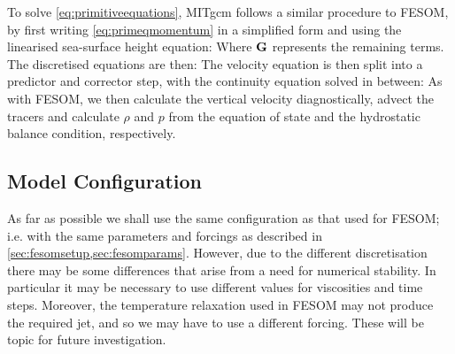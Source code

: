 To solve \cref{eq:primitiveequations}, MITgcm follows a similar procedure to FESOM, by first writing \cref{eq:primeqmomentum} in a simplified form and using the linearised sea-surface height equation:
Where $\mathbf{G}$ represents the remaining terms. The discretised equations are then:
The velocity equation is then split into a predictor and corrector step, with the continuity equation solved in between:
As with FESOM, we then calculate the vertical velocity diagnostically, advect the tracers and calculate $\rho$ and $p$ from the equation of state and the hydrostatic balance condition, respectively. 

\subsection{Model Configuration}

As far as possible we shall use the same configuration as that used for FESOM; i.e. with the same parameters and forcings as described in \cref{sec:fesomsetup,sec:fesomparams}. However, due to the different discretisation there may be some differences that arise from a need for numerical stability. In particular it may be necessary to use different values for viscosities and time steps. Moreover, the temperature relaxation used in FESOM may not produce the required jet, and so we may have to use a different forcing. These will be topic for future investigation.  